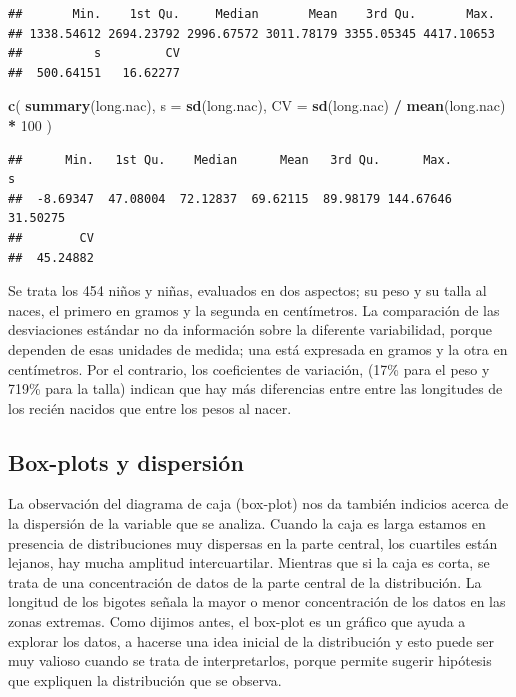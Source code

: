 \documentclass[]{book}
\newenvironment{Shaded}{\begin{snugshade}}{\end{snugshade}}
\newcommand{\DataTypeTok}[1]{\textcolor[rgb]{0.13,0.29,0.53}{#1}}
\newcommand{\DecValTok}[1]{\textcolor[rgb]{0.00,0.00,0.81}{#1}}
\newcommand{\KeywordTok}[1]{\textcolor[rgb]{0.13,0.29,0.53}{\textbf{#1}}}
\newcommand{\NormalTok}[1]{#1}
\newcommand{\OperatorTok}[1]{\textcolor[rgb]{0.81,0.36,0.00}{\textbf{#1}}}
\newcommand{\StringTok}[1]{\textcolor[rgb]{0.31,0.60,0.02}{#1}}
\begin{document}
\begin{verbatim}
##       Min.    1st Qu.     Median       Mean    3rd Qu.       Max. 
## 1338.54612 2694.23792 2996.67572 3011.78179 3355.05345 4417.10653 
##          s         CV 
##  500.64151   16.62277
\end{verbatim}

\begin{Shaded}
\begin{Highlighting}[]
\KeywordTok{c}\NormalTok{(}
  \KeywordTok{summary}\NormalTok{(long.nac),}
  \DataTypeTok{s =} \KeywordTok{sd}\NormalTok{(long.nac),}
  \DataTypeTok{CV =} \KeywordTok{sd}\NormalTok{(long.nac) }\OperatorTok{/}\StringTok{ }\KeywordTok{mean}\NormalTok{(long.nac) }\OperatorTok{*}\StringTok{ }\DecValTok{100}
\NormalTok{)}
\end{Highlighting}
\end{Shaded}

\begin{verbatim}
##      Min.   1st Qu.    Median      Mean   3rd Qu.      Max.         s 
##  -8.69347  47.08004  72.12837  69.62115  89.98179 144.67646  31.50275 
##        CV 
##  45.24882
\end{verbatim}

Se trata los 454 niños y niñas, evaluados en dos aspectos; su
peso y su talla al naces, el primero en gramos y la segunda en centímetros. La comparación de las desviaciones estándar no da
información sobre la diferente variabilidad, porque dependen de esas
unidades de medida; una está expresada en gramos y la otra en centímetros. Por el contrario, los coeficientes de variación,
(17\% para el peso y 719\% para la talla) indican que hay más
diferencias entre entre las longitudes de los recién nacidos que entre los pesos al nacer.

\hypertarget{box-plots-y-dispersion}{%
\subsection{Box-plots y dispersión}\label{box-plots-y-dispersion}}

La observación del diagrama de caja (box-plot) nos da también indicios acerca de la dispersión de la variable que se analiza. Cuando la caja es larga estamos en presencia de distribuciones muy dispersas en la parte central, los cuartiles están lejanos, hay mucha amplitud intercuartilar.
Mientras que si la caja es corta, se trata de una concentración de datos
de la parte central de la distribución. La longitud de los bigotes
señala la mayor o menor concentración de los datos en las zonas
extremas. Como dijimos antes, el box-plot es un gráfico que ayuda a
explorar los datos, a hacerse una idea inicial de la distribución y esto puede ser muy valioso cuando se trata de interpretarlos, porque permite sugerir hipótesis que expliquen la distribución que se observa.
\end{document}
